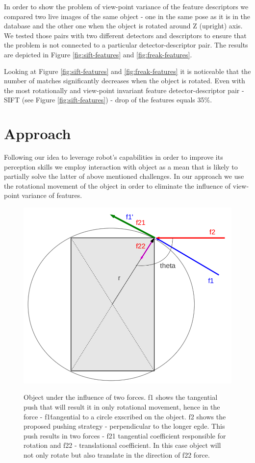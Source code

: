 In order to show the problem of view-point variance of the feature descriptors we compared two live images of the same object - one in the same pose as it is in the database and the other one when the object is rotated around Z (upright) axis. We tested those pairs with two different detectors and descriptors to ensure that the problem is not connected to a particular detector-descriptor pair. The results are depicted in Figure \ref{fig:sift-features} and \ref{fig:freak-features}.%

Looking at Figure \ref{fig:sift-features} and \ref{fig:freak-features} it is noticeable that the number of matches significantly decreases when the object is rotated. Even with the most rotationally and view-point invariant feature detector-descriptor pair - SIFT (see Figure \ref{fig:sift-features}) - drop of the features equals 35$\%$.



\section{Approach}

Following our idea to leverage robot's capabilities in order to improve its perception skills we employ interaction with object as a mean that is likely to partially solve the latter of above mentioned challenges. In our approach we use the rotational movement of the object in order to eliminate the influence of view-point variance of features.

\begin{figure}
\centering 

\includegraphics[width=0.5\columnwidth]{figures/rectangle-angle.png}\\


\caption{Object under the influence of two forces. f1 shows the tangential push that will result it in only rotational movement, hence in the force - f1\' tangential to a circle exscribed on the object. f2 shows the proposed pushing strategy - perpendicular to the longer egde. This push results in two forces - f21 tangential coefficient responsible for rotation and f22 - translational coefficient. In this case object will not only rotate but also translate in the direction of f22 force.  }
\label{fig:angles-rectangle}
\end{figure}


